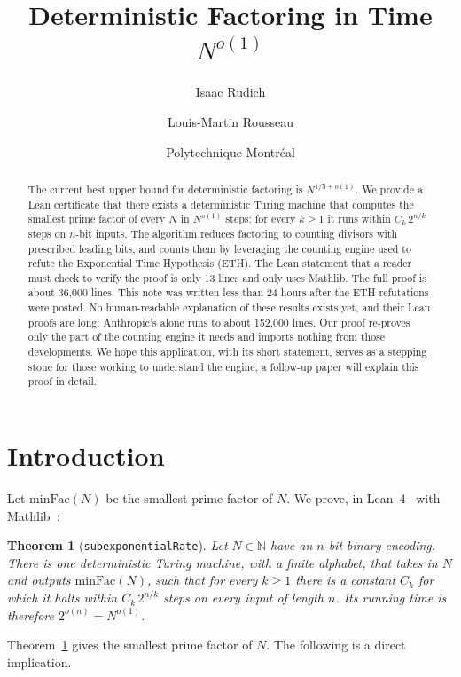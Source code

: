 \documentclass[11pt]{article}
\title{Deterministic Factoring in Time $N^{o(1)}$}
\author{Isaac Rudich \and Louis-Martin Rousseau}
\date{Polytechnique Montr\'eal}
\newtheorem{theorem}{Theorem}
\newcommand{\code}[1]{\texttt{#1}}
\begin{document}
\maketitle

\begin{abstract}
The current best upper bound for deterministic factoring is $N^{1/5+o(1)}$. 
We provide a Lean certificate that there exists a deterministic Turing
machine that computes the smallest prime factor of every $N$ in $N^{o(1)}$ steps: for every $k\ge 1$ it runs within
$C_k\,2^{n/k}$ steps on $n$-bit inputs. 
The algorithm reduces factoring to counting divisors with prescribed leading bits, and counts them by leveraging the counting engine used to refute the Exponential Time Hypothesis (ETH). 
The Lean statement that a reader must check to verify the proof is only 13 lines and only uses Mathlib. 
The full proof is about 36{,}000 lines. 
This note was written less than 24 hours after the ETH refutations were posted. 
No human-readable explanation of these results exists yet, and their Lean proofs are long: 
Anthropic's alone runs to about 152{,}000 lines. 
Our proof re-proves only the part of the counting engine it needs and imports nothing
from those developments. We hope this application, with its short statement, serves as a stepping stone for
those working to understand the engine; a follow-up paper will explain this proof in detail.
\end{abstract}

\section{Introduction}

Let $\mathrm{minFac}(N)$ be the smallest prime factor of $N$. We prove, in Lean~4~\cite{lean4} with
Mathlib~\cite{mathlib20}:

\begin{theorem}[\code{subexponentialRate}]\label{thm:main}
Let $N \in \mathbb{N}$ have an $n$-bit binary encoding.
There is one deterministic Turing machine, with a finite alphabet, that takes in $N$ and outputs $\mathrm{minFac}(N)$, such that for every $k\ge1$ there is a constant $C_k$
for which it halts within $C_k\,2^{n/k}$ steps on every input of length $n$. Its running time is therefore
$2^{o(n)}=N^{o(1)}$.
\end{theorem}

\noindent Theorem~\ref{thm:main} gives the smallest prime factor of $N$. The following is a direct implication.
\end{document}
